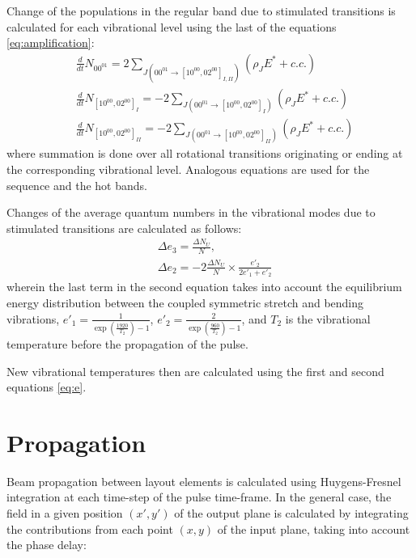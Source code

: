 \documentclass{report}
\begin{document}
Change of the populations in the regular band due to stimulated transitions is calculated for each vibrational level using the last of the equations \ref{eq:amplification}:
\begin{equation}\label{eq:dNdt}
\begin{aligned}
&\frac{d}{dt}N_{00^01} = 2\sum\limits_{J(00^01\rightarrow[10^00,02^00]_{I,II})} (\rho _J E^* + c.c.)\\
&\frac{d}{dt}N_{[10^00,02^00]_I} =  -2\sum\limits_{J(00^01\rightarrow[10^00,02^00]_I)} (\rho _J E^* + c.c.)\\
&\frac{d}{dt}N_{[10^00,02^00]_{II}} =  -2\sum\limits_{J(00^01\rightarrow[10^00,02^00]_{II})} (\rho _J E^* + c.c.)
\end{aligned}
\end{equation}
where summation is done over all rotational transitions originating or ending at the corresponding vibrational level. Analogous equations are used for the sequence and the hot bands.

Changes of the average quantum numbers in the vibrational modes due to stimulated transitions are calculated as follows:
\begin{equation}\label{eq:Deltae}
\begin{aligned}
&\Delta e_3 = \frac{\Delta N_U}{N},\\
&\Delta e_2 = -2\frac{\Delta N_U}{N} \times \frac{e'_2}{2e'_1+e'_2}
\end{aligned}
\end{equation}
wherein the last term in the second equation takes into account the equilibrium energy distribution between the coupled symmetric stretch and bending vibrations, $e'_1 = \frac{1}{\exp\left(\frac{1920}{T_2}\right)-1}$, $e'_2 = \frac{2}{\exp\left(\frac{960}{T_2}\right)-1}$, and $T_2$ is the vibrational temperature before the propagation of the pulse.

New vibrational temperatures then are calculated using the first and second equations \ref{eq:e}.



\section{Propagation}
Beam propagation between layout elements is calculated using Huygens-Fresnel integration at each time-step of the pulse time-frame. In the general case, the field in a given position $(x',y')$ of the output plane is calculated by integrating the contributions from each point $(x,y)$ of the input plane, taking into account the phase delay:
\end{document}
